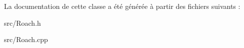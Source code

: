 La documentation de cette classe a été générée à partir des fichiers suivants :\begin{DoxyCompactItemize}
\item 
src/Roach.h\item 
src/Roach.cpp\end{DoxyCompactItemize}
